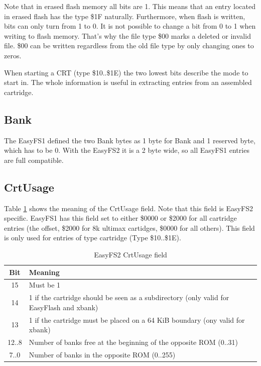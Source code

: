 \documentclass[a4paper,oneside]{memoir}
\begin{document}
Note that in erased flash memory all bits are 1. This means that an entry
located in erased flash has the type \$1F naturally. Furthermore, when flash is
written, bits can only turn from 1 to 0. It is not possible to change a bit
from 0 to 1 when writing to flash memory. That's why the file type \$00 marks a
deleted or invalid file. \$00 can be written regardless from the old file type
by only changing ones to zeros.

When starting a CRT (type \$10..\$1E) the two lowest bits describe the
mode to start in. The whole information is useful in extracting entries
from an assembled cartridge.


\subsection{Bank}

The EasyFS1 defined the two Bank bytes as 1 byte for Bank and 1 reserved byte, which has to be 0.
With the EasyFS2 it is a 2 byte wide, so all EasyFS1 entries are full compatible.


\subsection{CrtUsage}

Table \ref{tab:easyfs-crtusage} shows the meaning of the CrtUsage field.
Note that this field is EasyFS2 specific. EasyFS1 has this field set to either \$0000 or \$2000
for all cartridge entries (the offset, \$2000 for 8k ultimax cartidges, \$0000 for all others).
This field is only used for entries of type cartridge (Type \$10..\$1E).

\begin{table}[!htbp]
    \centering
    \begin{tabularx}{\textwidth}{ cX }
        \toprule
        Bit & Meaning \\
        \midrule
        15      & Must be 1 \\[3pt]
        14      & 1 if the cartridge should be seen as a subdirectory
                  (only valid for EasyFlash and xbank) \\[3pt]
        13      & 1 if the cartridge must be placed on a 64 KiB boundary
                  (ony valid for xbank) \\[3pt]
        12..8   & Number of banks free at the beginning of the opposite ROM
                  (0..31) \\[3pt]
        7..0    & Number of banks in the opposite ROM
                  (0..255) \\[3pt]
        \bottomrule
    \end{tabularx}
    \caption{EasyFS2 CrtUsage field}
    \label{tab:easyfs-crtusage}
\end{table}
\end{document}
